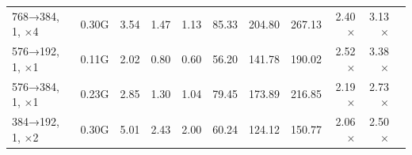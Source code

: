 \begin{table}
\begin{tabular}{lrrrrrrrrrr}
    768→384, 1, ×4                                          & 0.30G  & 3.54                           & 1.47                             & 1.13                       & 85.33  & 204.80  & 267.13  & 2.40$\times$ & 3.13$\times$ \\
    576→192, 1, ×1                                          & 0.11G  & 2.02                           & 0.80                             & 0.60                       & 56.20  & 141.78  & 190.02  & 2.52$\times$ & 3.38$\times$ \\
    576→384, 1, ×1                                          & 0.23G  & 2.85                           & 1.30                             & 1.04                       & 79.45  & 173.89  & 216.85  & 2.19$\times$ & 2.73$\times$ \\
    384→192, 1, ×2                                          & 0.30G  & 5.01                           & 2.43                             & 2.00                       & 60.24  & 124.12  & 150.77  & 2.06$\times$ & 2.50$\times$ \\
    \bottomrule
  \end{tabular}
\end{table}